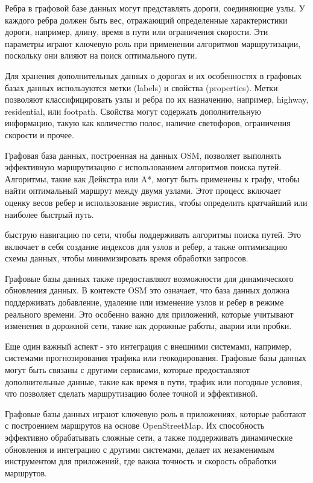 Ребра в графовой базе данных могут представлять дороги, соединяющие узлы. У каждого ребра должен быть вес, отражающий определенные характеристики дороги, например, длину, время в пути или ограничения скорости. Эти параметры играют ключевую роль при применении алгоритмов маршрутизации, поскольку они влияют на поиск оптимального пути.

Для хранения дополнительных данных о дорогах и их особенностях в графовых базах данных используются метки (labels) и свойства (properties). Метки позволяют классифицировать узлы и ребра по их назначению, например, highway, residential, или footpath. Свойства могут содержать дополнительную информацию, такую как количество полос, наличие светофоров, ограничения скорости и прочее.

Графовая база данных, построенная на данных OSM, позволяет выполнять эффективную маршрутизацию с использованием алгоритмов поиска путей. Алгоритмы, такие как Дейкстра или A*, могут быть применены к графу, чтобы найти оптимальный маршрут между двумя узлами. Этот процесс включает оценку весов ребер и использование эвристик, чтобы определить кратчайший или наиболее быстрый путь.

быструю навигацию по сети, чтобы поддерживать алгоритмы поиска путей. Это включает в себя создание индексов для узлов и ребер, а также оптимизацию схемы данных, чтобы минимизировать время обработки запросов.

Графовые базы данных также предоставляют возможности для динамического обновления данных. В контексте OSM это означает, что база данных должна поддерживать добавление, удаление или изменение узлов и ребер в режиме реального времени. Это особенно важно для приложений, которые учитывают изменения в дорожной сети, такие как дорожные работы, аварии или пробки.

Еще один важный аспект - это интеграция с внешними системами, например, системами прогнозирования трафика или геокодирования. Графовые базы данных могут быть связаны с другими сервисами, которые предоставляют дополнительные данные, такие как время в пути, трафик или погодные условия, что позволяет сделать маршрутизацию более точной и эффективной.

Графовые базы данных играют ключевую роль в приложениях, которые работают с построением маршрутов на основе OpenStreetMap. Их способность эффективно обрабатывать сложные сети, а также поддерживать динамические обновления и интеграцию с другими системами, делает их незаменимым инструментом для приложений, где важна точность и скорость обработки маршрутов.








